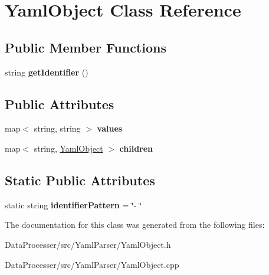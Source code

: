 \hypertarget{classYamlObject}{}\section{Yaml\+Object Class Reference}
\label{classYamlObject}
\subsection*{Public Member Functions}
\begin{DoxyCompactItemize}
\item 
\mbox{\label{classYamlObject_a9f6674ef3dde95221fd2611654027667}} 
string {\bfseries get\+Identifier} ()
\end{DoxyCompactItemize}
\subsection*{Public Attributes}
\begin{DoxyCompactItemize}
\item 
\mbox{\label{classYamlObject_a90d6d602ef87d34c5f827f4d4cad876b}} 
map$<$ string, string $>$ {\bfseries values}
\item 
\mbox{\label{classYamlObject_af6a9b072ca0b39bdfbc34ae4300da3de}} 
map$<$ string, \hyperlink{classYamlObject}{Yaml\+Object} $>$ {\bfseries children}
\end{DoxyCompactItemize}
\subsection*{Static Public Attributes}
\begin{DoxyCompactItemize}
\item 
\mbox{\label{classYamlObject_a762f87e22e4807a7c0fe0fa117f7c2c1}} 
static string {\bfseries identifier\+Pattern} = \char`\"{}-\/ \char`\"{}
\end{DoxyCompactItemize}


The documentation for this class was generated from the following files\+:\begin{DoxyCompactItemize}
\item 
Data\+Processer/src/\+Yaml\+Parser/Yaml\+Object.\+h\item 
Data\+Processer/src/\+Yaml\+Parser/Yaml\+Object.\+cpp\end{DoxyCompactItemize}
